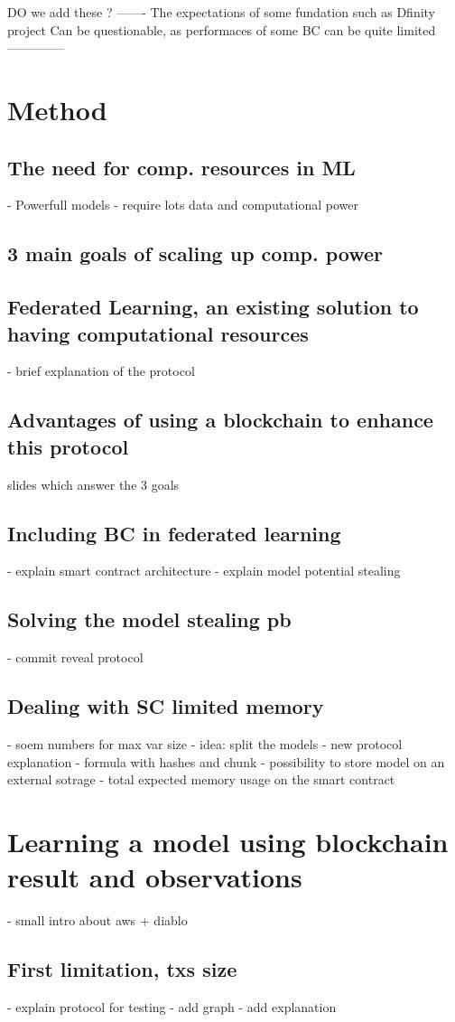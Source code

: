 \documentclass{article}
\begin{document}
DO we add these ? -------
The expectations of some fundation such as Dfinity project
Can be questionable, as performaces of some BC can be quite limited
--------------
\section{Method}
\subsection{The need for comp. resources in ML}
- Powerfull models
- require lots data and computational power
\subsection{3 main goals of scaling up comp. power}
\subsection{Federated Learning, an existing solution to having computational resources}
- brief explanation of the protocol
\subsection{Advantages of using a blockchain to enhance this protocol}
slides which answer the 3 goals
\subsection{Including BC in federated learning}
- explain smart contract architecture
- explain model potential stealing
\subsection{Solving the model stealing pb}
- commit reveal protocol
\subsection{Dealing with SC limited memory}
- soem numbers for max var size
- idea: split the models
- new protocol explanation
- formula with hashes and chunk
- possibility to store model on an external sotrage
- total expected memory usage on the smart contract
\section{Learning a model using blockchain result and observations}
- small intro about aws + diablo
\subsection{First limitation, txs size}
- explain protocol for testing
- add graph
- add explanation
\end{document}
